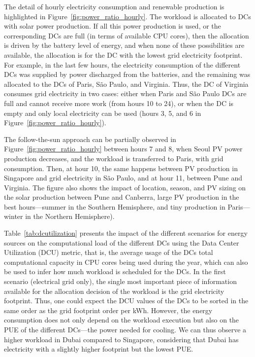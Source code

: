 The detail of hourly electricity consumption and renewable production is highlighted in Figure~\ref{fig:power_ratio_hourly}. The workload is allocated to DCs with solar power production. If all this power production is used, or the corresponding DCs are full (in terms of available CPU cores), then the allocation is driven by the battery level of energy, and when none of these possibilities are available, the allocation is for the DC with the lowest grid electricity footprint. For example, in the last few hours, the electricity consumption of the different DCs was supplied by power discharged from the batteries, and the remaining was allocated to the DCs of Paris, S\~ao Paulo, and Virginia. Thus, the DC of Virginia consumes grid electricity in two cases: either when Paris and S\~ao Paulo DCs are full and cannot receive more work (from hours 10 to 24), or when the DC is empty and only local electricity can be used (hours 3, 5, and 6 in Figure~\ref{fig:power_ratio_hourly}). 

The follow-the-sun approach can be partially observed in Figure~\ref{fig:power_ratio_hourly} between hours 7 and 8, when Seoul PV power production decreases, and the workload is transferred to Paris, with grid consumption. Then, at hour 10, the same happens between PV production in Singapore and grid electricity in S\~ao Paulo, and at hour 11, between Pune and Virginia. The figure also shows the impact of location, season, and PV sizing on the solar production between Pune and Canberra, large PV production in the best hours---summer in the Southern Hemisphere, and tiny production in Paris---winter in the Northern Hemisphere).


Table~\ref{tab:dcutilization} presents the impact of the different scenarios for energy sources on the computational load of the different DCs using the Data Center Utilization (DCU) metric, that is, the average usage of the DCs total computational capacity in CPU cores being used during the year, which can also be used to infer how much workload is scheduled for the DCs. In the first scenario (electrical grid only), the single most important piece of information available for the allocation decision of the workload is the grid electricity footprint. Thus, one could expect the DCU values of the DCs to be sorted in the same order as the grid footprint order per kWh. However, the energy consumption does not only depend on the workload execution but also on the PUE of the different DCs---the power needed for cooling. We can thus observe a higher workload in Dubai compared to Singapore, considering that Dubai has electricity with a slightly higher footprint but the lowest PUE. 

